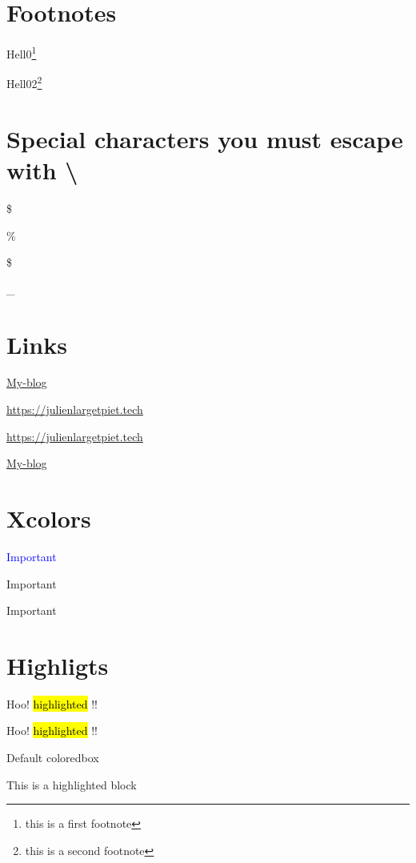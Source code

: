 \documentclass{article}
\newcommand{\mybloglink}{https://julienlargetpiet.tech}
\newcommand{\mybloglinkraw}{\url{https://julienlargetpiet.tech}}
\newcommand{\link}[2]{\href{#1}{#2}}
\begin{document}
\section{Footnotes}

Hell0\footnote{this is a first footnote}

Hell02\footnote{this is a second footnote}

\section{Special characters you must escape with \textbackslash}

\$

\%

\$

\_

\section{Links}
\label{sec:REF1}


\href{\mybloglink}{My-blog}

\url{\mybloglink}


\mybloglinkraw


\link{\mybloglink}{My-blog}

\section{Xcolors}

\textcolor{blue}{Important}

\textcolor{mycolor1}{Important} %

\textcolor[HTML]{FF5733}{Important} %


\section{Highligts}

Hoo! \hl{highlighted} !!


Hoo! \hl{highlighted} !!

Default coloredbox

\begin{tcolorbox}
This is a highlighted block
\end{tcolorbox}
\end{document}
